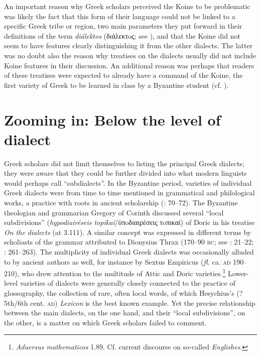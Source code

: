 An important reason why Greek scholars perceived the Koine to be problematic was likely the fact that this form of their language could not be linked to a specific Greek tribe or region, two main parameters they put forward in their definitions of the term \textit{diálektos} (διάλεκτoς; see \citealt{VanRooy2016d}), and that the Koine did not seem to have features clearly distinguishing it from the other dialects. The latter was no doubt also the reason why treatises on the dialects usually did not include Koine features in their discussion. An additional reason was perhaps that readers of these treatises were expected to already have a command of the Koine, the first variety of Greek to be learned in class by a Byzantine student (cf. \citealt{VanRooy2016b}).

\section{Zooming in: Below the level of dialect}\label{sec:2.4}

Greek scholars did not limit themselves to listing the principal Greek dialects; they were aware that they could be further divided into what modern linguists would perhaps call “subdialects”. In the Byzantine period, varieties of individual Greek dialects were from time to time mentioned in grammatical and philological works, a practice with roots in ancient scholarship (\citealt{Hainsworth1967}: 70–72). The Byzantine theologian and grammarian Gregory of Corinth discussed several “local subdivisions” (\textit{hypodiairéseis topikaí}/ὑπoδιαιρέσεις τoπικαί) of Doric in his treatise \textit{On the dialects} (at 3.111). A similar concept was expressed in different terms by scholiasts of the grammar attributed to Dionysius Thrax (170–90 \textsc{bc}; see \citealt{Lambert2009}: 21–22; \citealt{VanRooy2016d}: 261–263). The multiplicity of individual Greek dialects was occasionally alluded to by ancient authors as well, for instance by Sextus Empiricus (\textit{fl.} ca. \textsc{ad} 190–210), who drew attention to the multitude of Attic and Doric varieties.\footnote{\textit{Aduersus mathematicos} 1.89. Cf. current discourse on so-called \textit{Englishes}.} Lower-level varieties of dialects were generally closely connected to the practice of glossography, the collection of rare, often local words, of which Hesychius’s (?5th/6th cent. \textsc{ad}) \textit{Lexicon} is the best known example. Yet the precise relationship between the main dialects, on the one hand, and their “local subdivisions”, on the other, is a matter on which Greek scholars failed to comment.

